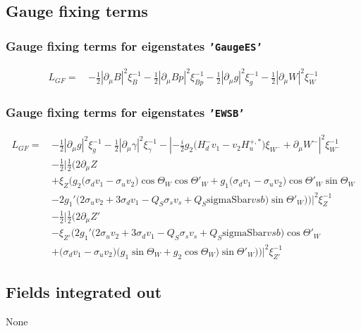 \subsection{Gauge fixing terms} 
\subsubsection{Gauge fixing terms for eigenstates {\tt 'GaugeES'} } 
\begin{align} 
L_{GF} = \, &-\frac{1}{2} |\partial_{\mu}B|^2 \xi_{B}^{-1}  -\frac{1}{2} |\partial_{\mu}Bp|^2 \xi_{Bp}^{-1}  -\frac{1}{2} |\partial_{\mu}g|^2 \xi_{g}^{-1}  -\frac{1}{2} |\partial_{\mu}W|^2 \xi_{W}^{-1} 
\end{align} 
\subsubsection{Gauge fixing terms for eigenstates {\tt 'EWSB'} } 
\begin{align} 
L_{GF} = \, &-\frac{1}{2} |\partial_{\mu}g|^2 \xi_{g}^{-1} -\frac{1}{2} |\partial_{\mu}\gamma|^2 \xi_{\gamma}^{-1} - |-\frac{i}{2} g_2 \Big(H_d^- v_1  - v_2 H_u^{+,*} \Big)\xi_{W^-}  + \partial_{\mu}W^-|^2 \xi_{W^-}^{-1} \nonumber \\ 
 &-\frac{1}{2} |\frac{1}{2} \Big(2 \partial_{\mu}Z \nonumber \\ 
 &+\xi_{Z} \Big(g_2 \Big(\sigma_{d} v_1  - \sigma_{u} v_2 \Big)\cos\Theta_W  \cos{\Theta'}_W  +g_1 \Big(\sigma_{d} v_1  - \sigma_{u} v_2 \Big)\cos{\Theta'}_W  \sin\Theta_W  \nonumber \\ 
 &-2 g_1' \Big(2 \sigma_{u} v_2  + 3 \sigma_{d} v_1  - Q_{S} \sigma_s v_s  + Q_{S} \text{sigmaSbar} vsb \Big)\sin{\Theta'}_W  \Big)\Big)|^2 \xi_{Z}^{-1} \nonumber \\ 
 &-\frac{1}{2} |\frac{1}{2} \Big(2 \partial_{\mu}{Z'} \nonumber \\ 
 &- \xi_{{Z'}} \Big(2 g_1' \Big(2 \sigma_{u} v_2  + 3 \sigma_{d} v_1  - Q_{S} \sigma_s v_s  + Q_{S} \text{sigmaSbar} vsb \Big)\cos{\Theta'}_W  \nonumber \\ 
 &+\Big(\sigma_{d} v_1  - \sigma_{u} v_2 \Big)\Big(g_1 \sin\Theta_W   + g_2 \cos\Theta_W  \Big)\sin{\Theta'}_W  \Big)\Big)|^2 \xi_{{Z'}}^{-1} 
\end{align} 
\subsection{Fields integrated out} 
None 
